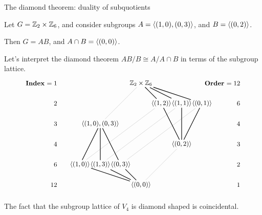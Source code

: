\documentclass[8pt, handout]{beamer}
\newcommand{\Pause}{}      %
\begin{document}
\begin{frame}{The diamond theorem: duality of subquotients}
  
  Let $G=\mathbb{Z}_2\times\mathbb{Z}_6$, and consider subgroups $A=\langle(1,0),(0,3)\rangle$,
  and $B=\langle(0,2)\rangle$. \medskip\Pause
  
  Then $G=AB$, and $A\cap B=\langle(0,0)\rangle$. \medskip\Pause
  
  Let's interpret the diamond theorem $AB/B\cong A/A\cap B$ in terms
  of the subgroup lattice.
  \[
  \begin{tikzpicture}[shorten >= -2pt, shorten <= -2pt]
    \tikzstyle{every node}=[font=\small]
    \tikzstyle{B} = [thick]
    \begin{scope}[shift={(0,0)}]
      \node(G) at (0,6) {$\Z_2\times\Z_6$};
      \node(12) at (1,5) {$\<(1,2)\>$};
      \node(11) at (2,5) {$\<(1,1)\>$};
      \node(01) at (3,5) {$\<(0,1)\>$};
      \node(10-03) at (-2,4) {$\<(1,0),(0,3)\>$};
      \node(02) at (2,3) {$\<(0,2)\>$};
      \node(10) at (-3,2) {$\<(1,0)\>$};
      \node(13) at (-2,2) {$\<(1,3)\>$};
      \node(03) at (-1,2) {$\<(0,3)\>$};
      \node(00) at (0,1) {$\<(0,0)\>$};
      \draw[faded] (10-03) to (G);
      \draw[faded] (12) to (10); 
      \draw[faded] (11) to (13); 
      \draw[faded] (01) to (03);
      \draw[faded] (00) to (02);
      \draw[B] (G) to (12); \draw[B] (G) to (11); 
      \draw[B] (G) to (01);
      \draw[B] (02) to (12); \draw[B] (02) to (11); 
      \draw[B] (02) to (01);
      \draw[B] (10-03) to (10); \draw[B] (10-03) to (13); 
      \draw[B] (10-03) to (03); 
      \draw[B] (00) to (10); \draw[B] (00) to (13); 
      \draw[B] (00) to (03); 
    \end{scope}
    \begin{scope}[shift={(-4,0)}]
      \node[anchor=east] at (0,6) {\textbf{Index} $=1$};
      \node[anchor=east] at (0,5) {$2$};
      \node[anchor=east] at (0,4) {$3$};
      \node[anchor=east] at (0,3) {$4$};
      \node[anchor=east] at (0,2) {$6$};
      \node[anchor=east] at (0,1) {$12$};
   \end{scope}
    \begin{scope}[shift={(5,0)}]
      \node[anchor=east] at (0,6) {\textbf{Order} $=12$};
      \node[anchor=east] at (0,5) {$6$};
      \node[anchor=east] at (0,4) {$4$};
      \node[anchor=east] at (0,3) {$3$};
      \node[anchor=east] at (0,2) {$2$};
      \node[anchor=east] at (0,1) {$1$};
   \end{scope}
  \end{tikzpicture}
  \]
  
  The fact that the subgroup lattice of $V_4$ is diamond shaped is coincidental.
  
\end{frame}
\end{document}
